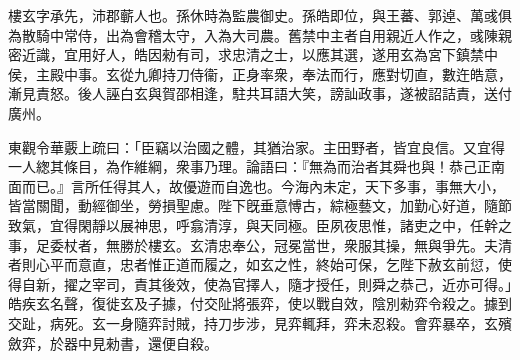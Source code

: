 \begin{pinyinscope}
 
 
 樓玄字承先，沛郡蘄人也。孫休時為監農御史。孫皓即位，與王蕃、郭逴、萬彧俱為散騎中常侍，出為會稽太守，入為大司農。舊禁中主者自用親近人作之，彧陳親密近識，宜用好人，皓因勑有司，求忠清之士，以應其選，遂用玄為宮下鎮禁中侯，主殿中事。玄從九卿持刀侍衞，正身率衆，奉法而行，應對切直，數迕皓意，漸見責怒。後人誣白玄與賀邵相逢，駐共耳語大笑，謗訕政事，遂被詔詰責，送付廣州。
 
 
 
 
 東觀令華覈上疏曰：「臣竊以治國之體，其猶治家。主田野者，皆宜良信。又宜得一人緫其條目，為作維綱，衆事乃理。論語曰：『無為而治者其舜也與！恭己正南面而已。』言所任得其人，故優遊而自逸也。今海內未定，天下多事，事無大小，皆當關聞，動經御坐，勞損聖慮。陛下旣垂意愽古，綜極藝文，加勤心好道，隨節致氣，宜得閑靜以展神思，呼翕清淳，與天同極。臣夙夜思惟，諸吏之中，任幹之事，足委杖者，無勝於樓玄。玄清忠奉公，冠冕當世，衆服其操，無與爭先。夫清者則心平而意直，忠者惟正道而履之，如玄之性，終始可保，乞陛下赦玄前愆，使得自新，擢之宰司，責其後效，使為官擇人，隨才授任，則舜之恭己，近亦可得。」皓疾玄名聲，復徙玄及子據，付交阯將張弈，使以戰自效，陰別勑弈令殺之。據到交趾，病死。玄一身隨弈討賊，持刀步涉，見弈輒拜，弈未忍殺。會弈暴卒，玄殯斂弈，於器中見勑書，還便自殺。
 
 
 
 
\end{pinyinscope}